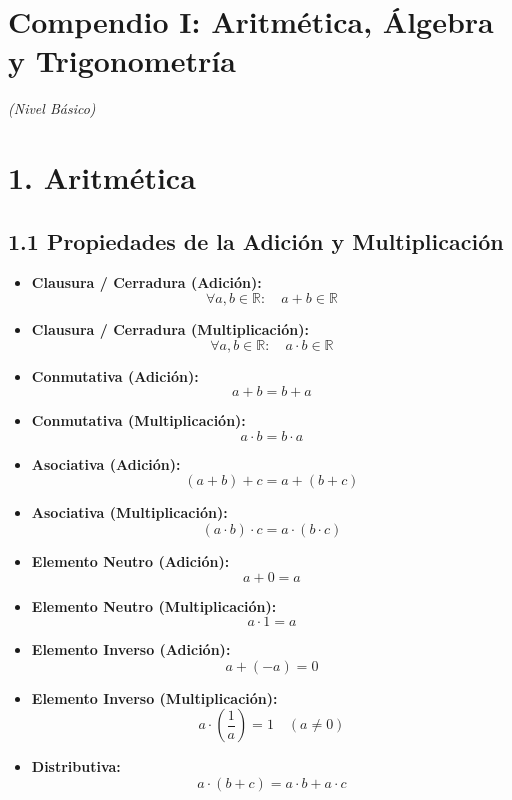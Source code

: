 \documentclass[11pt,a4paper]{article}
\begin{document}
\section*{Compendio I: Aritmética, Álgebra y Trigonometría}

\textit{(Nivel Básico)}

\section*{1. Aritmética}

\subsection*{1.1 Propiedades de la Adición y Multiplicación}

\begin{itemize}
  \item \textbf{Clausura / Cerradura (Adición):}
  \[
    \forall a, b \in \mathbb{R}: \quad a + b \in \mathbb{R}
  \]
  \item \textbf{Clausura / Cerradura (Multiplicación):}
  \[
    \forall a, b \in \mathbb{R}: \quad a \cdot b \in \mathbb{R}
  \]
  \item \textbf{Conmutativa (Adición):}
  \[
    a + b = b + a
  \]
  \item \textbf{Conmutativa (Multiplicación):}
  \[
    a \cdot b = b \cdot a
  \]
  \item \textbf{Asociativa (Adición):}
  \[
    (a + b) + c = a + (b + c)
  \]
  \item \textbf{Asociativa (Multiplicación):}
  \[
    (a \cdot b) \cdot c = a \cdot (b \cdot c)
  \]
  \item \textbf{Elemento Neutro (Adición):}
  \[
    a + 0 = a
  \]
  \item \textbf{Elemento Neutro (Multiplicación):}
  \[
    a \cdot 1 = a
  \]
  \item \textbf{Elemento Inverso (Adición):}
  \[
    a + (-a) = 0
  \]
  \item \textbf{Elemento Inverso (Multiplicación):}
  \[
    a \cdot \left(\frac{1}{a}\right) = 1 \quad (a \ne 0)
  \]
  \item \textbf{Distributiva:}
  \[
    a \cdot (b + c) = a \cdot b + a \cdot c
  \]
\end{itemize}
\end{document}
